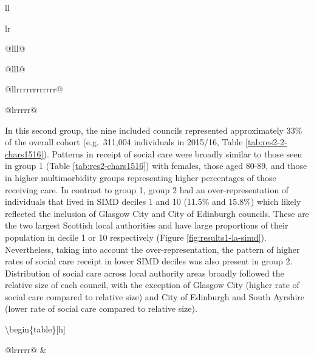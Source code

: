 \documentclass[12pt,a4paper,oneside,table]{report}
\begin{document}
\begin{tabular}[t]{ll}
\begin{tabular}{lr}
{\begin{tabular}{@{}lll@{}}
\begin{tabular}{@{}lll@{}}
\begin{tabular}{@{}llrrrrrrrrrrrr@{}}
{\begin{tabular}{@{}lrrrrr@{}}
{In this second group, the nine included councils represented
approximately 33\% of the overall cohort (e.g.~311,004 individuals in
2015/16, Table \ref{tab:res2-2-chars1516}). Patterns in receipt of
social care were broadly similar to those seen in group 1 (Table
\ref{tab:res2-chars1516}) with females, those aged 80-89, and those in
higher multimorbidity groups representing higher percentages of those
receiving care. In contrast to group 1, group 2 had an
over-representation of individuals that lived in SIMD deciles 1 and 10
(11.5\% and 15.8\%) which likely reflected the inclusion of Glasgow City
and City of Edinburgh councils. These are the two largest Scottish local
authorities and have large proportions of their population in decile 1
or 10 respectively (Figure \ref{fig:results1-la-simd}). Nevertheless,
taking into account the over-representation, the pattern of higher rates
of social care receipt in lower SIMD deciles was also present in group
2. Distribution of social care across local authority areas broadly
followed the relative size of each council, with the exception of
Glasgow City (higher rate of social care compared to relative size) and
City of Edinburgh and South Ayrshire (lower rate of social care compared
to relative size).

\textbackslash{}begin\{table\}{[}h{]} \footnotesize \centering

\begin{tabular}{@{}lrrrrr@{}}
\toprule
 & 
\end{tabular}}
\end{tabular}}
\end{tabular}
\end{tabular}
\end{tabular}}
\end{tabular}
\end{tabular}
\end{document}

